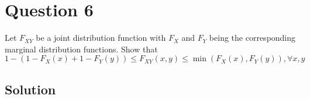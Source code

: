 \section*{Question 6}

Let \( F_{X Y} \) be a joint distribution function with \( F_{X} \) and \( F_{Y} \) being the corresponding marginal distribution functions.
Show that
\[
    1-\left(1-F_{X}(x)+1-F_{Y}(y)\right) \leq F_{X Y}(x, y) \leq \min \left(F_{X}(x), F_{Y}(y)\right), \forall x, y
\]

\subsection*{Solution}
